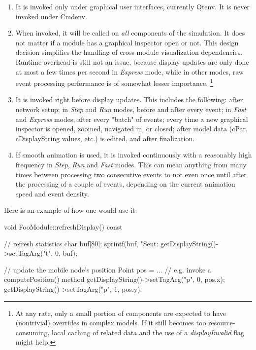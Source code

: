 \begin{enumerate}
\item It is invoked only under graphical user interfaces, currently Qtenv.
     It is never invoked under Cmdenv.

\item When invoked, it will be called on \textit{all} components of the
      simulation. It does not matter if a module has a graphical inspector
      open or not. This design decision simplifies the handling
      of cross-module visualization dependencies. Runtime overhead is
      still not an issue, because display updates are only done at most
      a few times per second in \textit{Express} mode, while in other modes,
      raw event processing performance is of somewhat lesser importance.
      \footnote{At any rate, only a small portion of components are expected to
      have (nontrivial)  overrides in complex models.
      If it still becomes too resource-consuming, local caching of related
      data and the use of a \textit{displayInvalid} flag might help.}

\item It is invoked right before display updates. This includes the following:
      after network setup; in \textit{Step} and \textit{Run} modes, before and
      after every event; in \textit{Fast} and \textit{Express} modes, after
      every "batch" of events; every time a new graphical inspector is opened,
      zoomed, navigated in, or closed; after model data (cPar, cDisplayString
      values, etc.) is edited, and after finalization.

\item If smooth animation is used, it is invoked continuously with a reasonably
      high frequency in \textit{Step}, \textit{Run} and \textit{Fast} modes.
      This can mean anything from many times between processing two consecutive
      events to not even once until after the processing of a couple of events,
      depending on the current animation speed and event density.

\end{enumerate}

Here is an example of how one would use it:

\begin{cpp}
void FooModule::refreshDisplay() const
{
    // refresh statistics
    char buf[80];
    sprintf(buf, "Sent:%
    getDisplayString()->setTagArg("t", 0, buf);

    // update the mobile node's position
    Point pos = ...  // e.g. invoke a computePosition() method
    getDisplayString()->setTagArg("p", 0, pos.x);
    getDisplayString()->setTagArg("p", 1, pos.y);
}
\end{cpp}

